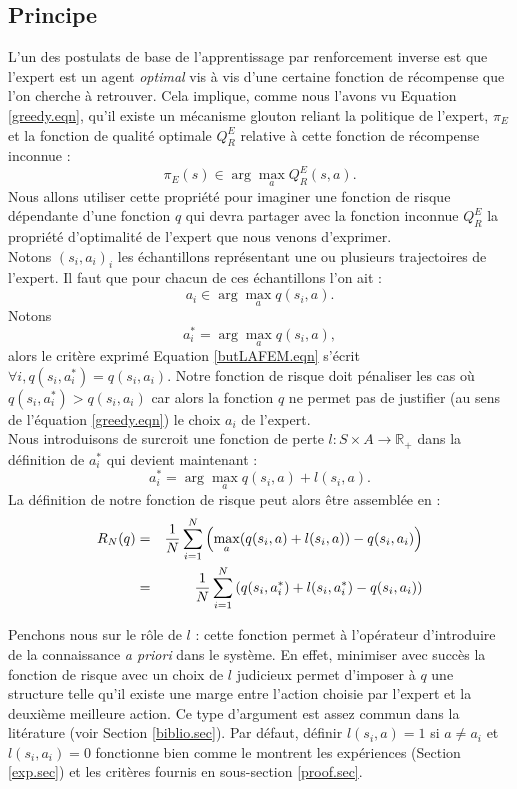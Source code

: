 \documentclass[publibook-draft]{CAp2012}
\begin{document}
\subsection{Principe}
L'un des postulats de base de l'apprentissage par renforcement inverse est que l'expert est un agent \emph{optimal} vis à vis d'une certaine fonction de récompense que l'on cherche à retrouver. Cela implique, comme nous l'avons vu Equation \ref{greedy.eqn}, qu'il existe un mécanisme glouton reliant la politique de l'expert, $\pi_E$ et la fonction de qualité optimale $Q^E_R$ relative à cette fonction de récompense inconnue :
\begin{equation}
\pi_E(s) \in \arg\max_aQ^E_R(s,a).
\end{equation}
Nous allons utiliser cette propriété pour imaginer une fonction de risque dépendante d'une fonction $q$ qui devra partager avec la fonction inconnue $Q^E_R$ la propriété d'optimalité de l'expert que nous venons d'exprimer.\\
Notons $(s_i,a_i)_i$ les échantillons représentant une ou plusieurs trajectoires de l'expert. Il faut que pour chacun de ces échantillons l'on ait :
\begin{equation}
\label{butLAFEM.eqn}
a_i \in \arg\max_aq(s_i,a).
\end{equation}
Notons
\begin{equation}
a^*_i = \arg\max_aq(s_i,a),
\end{equation}
alors le critère exprimé Equation \ref{butLAFEM.eqn} s'écrit $\forall i, q(s_i,a^*_i) = q(s_i,a_i)$. Notre fonction de risque doit pénaliser les cas où $q(s_i,a^*_i)>q(s_i,a_i)$ car alors la fonction $q$ ne permet pas de justifier (au sens de l'équation \ref{greedy.eqn}) le choix $a_i$ de l'expert.\\
Nous introduisons de surcroit une fonction de perte $l : S \times A \rightarrow \mathbb{R}_+$ dans la définition de $a^*_i$ qui devient maintenant :
\begin{equation}
\label{astar.def}
a^*_i = \arg\max_aq(s_i,a) + l(s_i,a).
\end{equation}
La définition de notre fonction de risque peut alors être assemblée en :
  \begin{eqnarray}
   R_N(q) &=& {1\over N} \sum_{i=1}^N\left(\max_{a}(q(s_i,a) + l(s_i,a)) - q(s_i,a_i) \right)\\
   &=& {1\over N} \sum_{i=1}^N\left(q(s_i,a_i^*) + l(s_i,a_i^*) - q(s_i,a_i) \right)
   \end{eqnarray}

Penchons nous sur le rôle de $l$ : cette fonction permet à l'opérateur d'introduire de la connaissance \emph{a priori} dans le système. En effet, minimiser avec succès la fonction de risque avec un choix de $l$ judicieux permet d'imposer à $q$ une structure telle qu'il existe une marge entre l'action choisie par l'expert et la deuxième meilleure action. Ce type d'argument est assez commun dans la litérature (voir Section \ref{biblio.sec}). Par défaut, définir $l(s_i,a) = 1$ si $a\neq a_i$ et $l(s_i,a_i)=0$ fonctionne bien comme le montrent les expériences (Section \ref{exp.sec}) et les critères fournis en sous-section \ref{proof.sec}.\\
\end{document}
